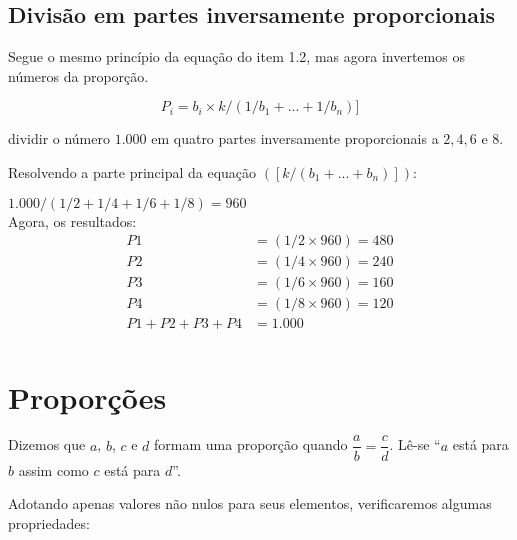 \subsection{Divisão em partes inversamente proporcionais}

Segue o mesmo princípio da equação do item 1.2, mas agora invertemos os números da proporção.

\begin{equation}
P_i = b_i \times k/(1/b_1 +...+ 1/b_n )]
\end{equation}

\begin{exe}
dividir o número $1.000$ em quatro partes inversamente proporcionais a $2, 4, 6$ e $8$. 
\end{exe}

	Resolvendo a parte principal da equação $([k/(b_1+...+b_n)])$:
	
$1.000 / (1/2 + 1/4 + 1/6 + 1/8) = 960$\\

Agora, os resultados:\\
\begin{align*}
	P1 &= (1/2 \times 960) = 480\\
	P2 &= (1/4 \times 960) = 240\\
	P3 &= (1/6 \times 960) = 160\\
	P4 &= (1/8 \times 960) = 120\\
	P1 + P2 + P3 + P4 &= 1.000\\
\end{align*}


\section{Proporções}
\begin{defi}
Dizemos que $a$, $b$, $c$ e $d$ formam uma proporção quando $\dfrac{a}{b}=\dfrac{c}{d}$. Lê-se ``$a$ está para $b$ assim como $c$ está para $d$''.
\end{defi}

Adotando apenas valores não nulos para seus elementos, verificaremos algumas propriedades:


